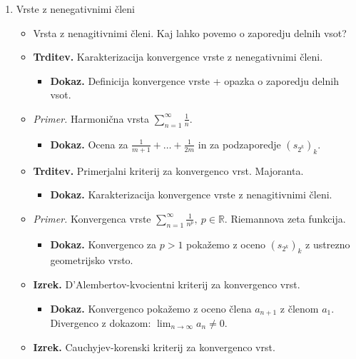 \begin{enumerate}
    \item Vrste z nenegativnimi členi
    \begin{itemize}
        \item Vrsta z nenagitivnimi členi. Kaj lahko povemo o zaporedju delnih vsot?
        \item \colorbox{blue!30}{\textbf{Trditev.}} Karakterizacija konvergence vrste z nenegativnimi členi.
        \begin{itemize}
            \item \colorbox{green!30}{\textbf{Dokaz.}} Definicija konvergence vrste + opazka o zaporedju delnih vsot.
        \end{itemize}
        \item \colorbox{yellow!30}{\emph{Primer.}} Harmonična vrsta $\sum_{n=1}^{\infty} \frac{1}{n}$.
        \begin{itemize}
            \item \colorbox{green!30}{\textbf{Dokaz.}} Ocena za $\frac{1}{m+1} + \ldots + \frac{1}{2m}$ in za podzaporedje $(s_{2^k})_k$.
        \end{itemize}
        \item  \colorbox{blue!30}{\textbf{Trditev.}} Primerjalni kriterij za konvergenco vrst. Majoranta.
        \begin{itemize}
            \item \colorbox{green!30}{\textbf{Dokaz.}} Karakterizacija konvergence vrste z nenagitivnimi členi.
        \end{itemize}
        \item \colorbox{yellow!30}{\emph{Primer.}} Konvergenca vrste $\sum_{n=1}^{\infty} \frac{1}{n^p}, \ p \in \mathbb{R}$. Riemannova zeta funkcija.
        \begin{itemize}
            \item \colorbox{green!30}{\textbf{Dokaz.}} Konvergenco za $p>1$ pokažemo z oceno $(s_{2^k})_k$ z ustrezno geometrijsko vrsto.
        \end{itemize}
        \item \colorbox{blue!30}{\textbf{Izrek.}} D'Alembertov-kvocientni kriterij za konvergenco vrst.
        \begin{itemize}
            \item \colorbox{green!30}{\textbf{Dokaz.}} Konvergenco pokažemo z oceno člena $a_{n+1}$ z členom $a_1$. Divergenco z dokazom: $\lim_{n \to \infty}a_n \neq 0$.
        \end{itemize}
        \item \colorbox{blue!30}{\textbf{Izrek.}} Cauchyjev-korenski kriterij za konvergenco vrst.

\end{itemize}
\end{enumerate}
